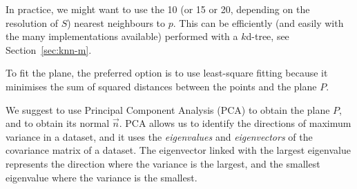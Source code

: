 In practice, we might want to use the 10 (or 15 or 20, depending on the resolution of $S$) nearest neighbours to $p$.
This can be efficiently (and easily with the many implementations available) performed with a $k$d-tree, see Section~\ref{sec:knn-m}.

To fit the plane, the preferred option is to use least-square fitting because it minimises the sum of squared distances between the points and the plane $P$.

We suggest to use Principal Component Analysis (PCA) 
%
to obtain the plane $P$, and to obtain its normal $\vec{n}$.
PCA allows us to identify the directions of maximum variance in a dataset, and it uses the \emph{eigenvalues} and \emph{eigenvectors} of the covariance matrix of a dataset.
%
The eigenvector linked with the largest eigenvalue represents the direction where the variance is the largest, and the smallest eigenvalue where the variance is the smallest.

%

